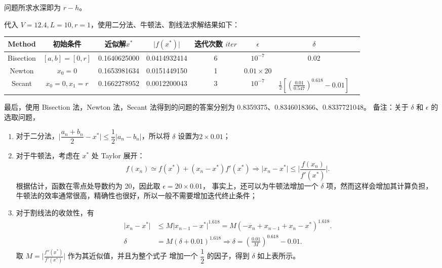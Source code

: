 \documentclass[lang=cn,a4paper,newtx,bibend=bibtex]{elegantpaper}
\begin{document}
问题所求水深即为 $r-h$。

代入 $V=12.4, L = 10, r = 1$，使用二分法、牛顿法、割线法求解结果如下：

\begin{table}[htbp]
	\centering
	\begin{tabular}{|c|c|c|c|c|c|c|c|}
		\hline
    Method & 初始条件 & 近似解$x^*$ & $\vert f(x^*) \vert$ & 迭代次数 $iter$ & $\epsilon$ & $\delta$ \\
    \hline
		Bisection & $[a,b]=[0,r]$ & 0.1640625000 & 0.0414932414 & 6 & $10^{-7}$ & 0.02\\
		\hline
    Newton& $x_0 = 0$ & 0.1653981634 & 0.0151449150 & 1  & $0.01\times 20$ & ~ \\
		\hline
    Secant & $x_0 = 0, x_1 = r$ & 0.1662278952 &  0.0012200043 & 3 &  $10^{-7}$ & $\frac12[(\frac{0.01}{0.547})^{0.618}-0.01]$ \\
		\hline
	\end{tabular}
\end{table}

最后，使用 Bisection 法，Newton 法，Secant 法得到的问题的答案分别为 0.8359375、0.8346018366、0.8337721048。
\newpage
备注：关于 $\delta$ 和 $\epsilon$ 的选取问题，

\begin{enumerate}
  \item 对于二分法，$\big\vert\dfrac{a_n+b_n}2-x^*\big\vert\le \dfrac12\big\vert a_n - b_n\big\vert$，所以将 $\delta$ 设置为$2\times 0.01$；
  \item 对于牛顿法，考虑在 $x^*$ 处 Taylor 展开：
        \[
          f(x_n)\simeq f(x^*)+(x_n-x^*)f'(x^*)
        \Rightarrow \bigg\vert x_n-x^*\bigg\vert \le \bigg \vert\dfrac{ f(x_n)}{f'(x^*)} \bigg\vert.
        \]
        根据估计，函数在零点处导数约为 20，因此取 $\epsilon = 20\times 0.01$，
        事实上，还可以为牛顿法增加一个 $\delta$ 项，然而这样会增加其计算负担，
        牛顿法的效率通常很高，精确性也很好，所以一般不需要增加迭代终止条件；
  \item 对于割线法的收敛性，有
        \begin{equation*}
          \begin{aligned}
          \vert x_n-x^* \vert &\le M{\vert x_{n-1} - x^{*}\vert}^{1.618} = M(-x_n + x_{n-1} + x_n - x^{*})^{1.618}. \\
          \delta &= M (\delta + 0.01)^{1.618} \Rightarrow \delta = (\frac{0.01}{M})^{0.618}-0.01.
        \end{aligned}
        \end{equation*}
        取 $M = \bigg\vert \frac{f''(x^*)}{f'(x^*)}\bigg\vert$ 作为其近似值，并且为整个式子
        增加一个 $\dfrac{1}{2}$ 的因子，得到 $\delta$ 如上表所示。
\end{enumerate}
\end{document}
